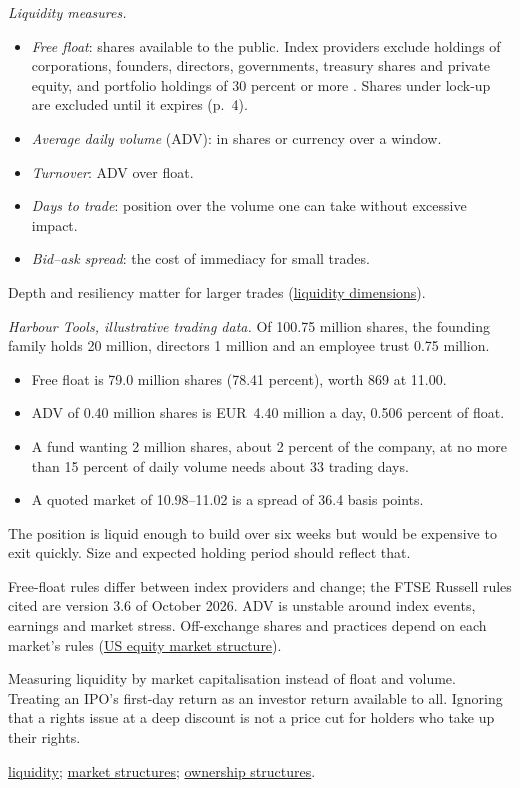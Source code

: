 \begin{qfdefinition}
\emph{Liquidity measures.}
\begin{itemize}
\item \emph{Free float}: shares available to the public. Index providers exclude holdings of corporations, founders, directors, governments, treasury shares and private equity, and portfolio holdings of 30 percent or more \citep[pp.~2--3]{ftse-free-float-2026}. Shares under lock-up are excluded until it expires (p.~4).
\item \emph{Average daily volume} (ADV): in shares or currency over a window.
\item \emph{Turnover}: ADV over float.
\item \emph{Days to trade}: position over the volume one can take without excessive impact.
\item \emph{Bid--ask spread}: the cost of immediacy for small trades.
\end{itemize}
Depth and resiliency matter for larger trades (\hyperref[def:liquidity-dimensions]{liquidity dimensions}).

 \emph{Harbour Tools, illustrative trading data.} Of 100.75 million shares, the founding family holds 20 million, directors 1 million and an employee trust 0.75 million.
\begin{itemize}
\item Free float is 79.0 million shares (78.41 percent), worth 869 at 11.00.
\item ADV of 0.40 million shares is EUR~4.40 million a day, 0.506 percent of float.
\item A fund wanting 2 million shares, about 2 percent of the company, at no more than 15 percent of daily volume needs about 33 trading days.
\item A quoted market of 10.98--11.02 is a spread of 36.4 basis points.
\end{itemize}
The position is liquid enough to build over six weeks but would be expensive to exit quickly. Size and expected holding period should reflect that.

 Free-float rules differ between index providers and change; the FTSE Russell rules cited are version 3.6 of October 2026. ADV is unstable around index events, earnings and market stress. Off-exchange shares and practices depend on each market's rules (\hyperref[rule:us-equity-market-structure]{US equity market structure}).

 Measuring liquidity by market capitalisation instead of float and volume. Treating an IPO's first-day return as an investor return available to all. Ignoring that a rights issue at a deep discount is not a price cut for holders who take up their rights.

 \hyperref[def:liquidity-dimensions]{liquidity}; \hyperref[def:market-structures-venues]{market structures}; \hyperref[def:global-ownership-structures]{ownership structures}.

\end{qfdefinition}

